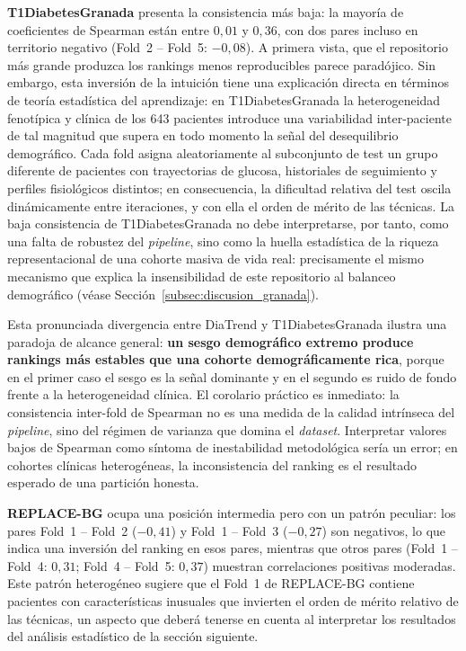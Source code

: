 \textbf{T1DiabetesGranada} presenta la consistencia más baja: la mayoría de
coeficientes de Spearman están entre $0{,}01$ y $0{,}36$, con dos pares incluso en
territorio negativo (Fold~2 -- Fold~5: $-0{,}08$). A primera vista, que el
repositorio más grande produzca los rankings menos reproducibles parece paradójico.
Sin embargo, esta inversión de la intuición tiene una explicación directa en términos
de teoría estadística del aprendizaje: en T1DiabetesGranada la heterogeneidad
fenotípica y clínica de los 643 pacientes introduce una variabilidad inter-paciente
de tal magnitud que supera en todo momento la señal del desequilibrio demográfico.
Cada fold asigna aleatoriamente al subconjunto de test un grupo diferente de
pacientes con trayectorias de glucosa, historiales de seguimiento y perfiles
fisiológicos distintos; en consecuencia, la dificultad relativa del test oscila
dinámicamente entre iteraciones, y con ella el orden de mérito de las técnicas.
La baja consistencia de T1DiabetesGranada no debe interpretarse, por tanto, como
una falta de robustez del \textit{pipeline}, sino como la huella estadística de la
riqueza representacional de una cohorte masiva de vida real: precisamente el mismo
mecanismo que explica la insensibilidad de este repositorio al balanceo demográfico
(véase Sección~\ref{subsec:discusion_granada}).

Esta pronunciada divergencia entre DiaTrend y T1DiabetesGranada ilustra una
paradoja de alcance general: \textbf{un sesgo demográfico extremo produce rankings
más estables que una cohorte demográficamente rica}, porque en el primer caso el
sesgo es la señal dominante y en el segundo es ruido de fondo frente a la
heterogeneidad clínica. El corolario práctico es inmediato: la consistencia
inter-fold de Spearman no es una medida de la calidad intrínseca del
\textit{pipeline}, sino del régimen de varianza que domina el \textit{dataset}.
Interpretar valores bajos de Spearman como síntoma de inestabilidad metodológica
sería un error; en cohortes clínicas heterogéneas, la inconsistencia del ranking
es el resultado esperado de una partición honesta.

\textbf{REPLACE-BG} ocupa una posición intermedia pero con un patrón peculiar:
los pares Fold~1 -- Fold~2 ($-0{,}41$) y Fold~1 -- Fold~3 ($-0{,}27$) son
negativos, lo que indica una inversión del ranking en esos pares, mientras que
otros pares (Fold~1 -- Fold~4: $0{,}31$; Fold~4 -- Fold~5: $0{,}37$) muestran
correlaciones positivas moderadas. Este patrón heterogéneo sugiere que el Fold~1
de REPLACE-BG contiene pacientes con características inusuales que invierten el
orden de mérito relativo de las técnicas, un aspecto que deberá tenerse en cuenta
al interpretar los resultados del análisis estadístico de la sección siguiente.

